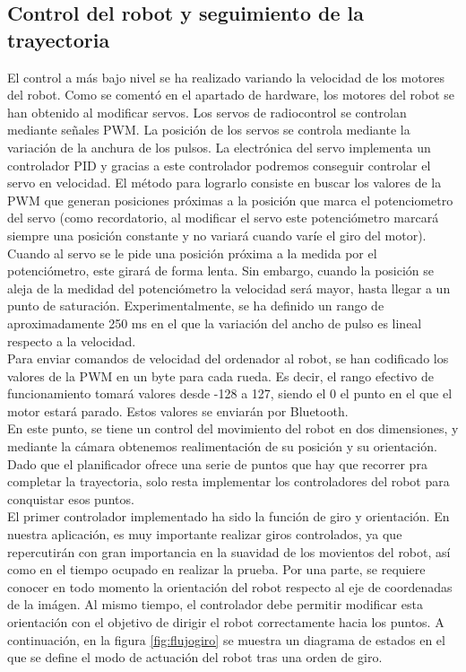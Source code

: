 \subsection{Control del robot y seguimiento de la trayectoria}
\label{control}

El control a más bajo nivel se ha realizado variando la velocidad de los motores del robot. Como se comentó en el apartado de hardware, los motores del robot se han obtenido al modificar servos. Los servos de radiocontrol se controlan mediante señales PWM. La posición de los servos se controla mediante la variación de la anchura de los pulsos. La electrónica del servo implementa un controlador PID y gracias a este controlador podremos conseguir controlar el servo en velocidad. El método para lograrlo consiste en buscar los valores de la PWM que generan posiciones próximas a la posición que marca el potenciometro del servo (como recordatorio, al modificar el servo este potenciómetro marcará siempre una posición constante y no variará cuando varíe el giro del motor). Cuando al servo se le pide una posición próxima a la medida por el potenciómetro, este girará de forma lenta. Sin embargo, cuando la posición se aleja de la medidad del potenciómetro la velocidad será mayor, hasta llegar a un punto de saturación. Experimentalmente, se ha definido un rango de aproximadamente 250 ms en el que la variación del ancho de pulso es lineal respecto a la velocidad. \\

Para enviar comandos de velocidad del ordenador al robot, se han codificado los valores de la PWM en un byte para cada rueda. Es decir, el rango efectivo de funcionamiento tomará valores desde -128 a 127, siendo el 0 el punto en el que el motor estará parado. Estos valores se enviarán por Bluetooth. \\

En este punto, se tiene un control del movimiento del robot en dos dimensiones, y mediante la cámara obtenemos realimentación de su posición y su orientación. Dado que el planificador ofrece una serie de puntos que hay que recorrer pra completar la trayectoria, solo resta implementar los controladores del robot para conquistar esos puntos. \\

El primer controlador implementado ha sido la función de giro y orientación. En nuestra aplicación, es muy importante realizar giros controlados, ya que repercutirán con gran importancia en la suavidad de los movientos del robot, así como en el tiempo ocupado en realizar la prueba. Por una parte, se requiere conocer en todo momento la orientación del robot respecto al eje de coordenadas de la imágen. Al mismo tiempo, el controlador debe permitir modificar esta orientación con el objetivo de dirigir el robot correctamente hacia los puntos. A continuación, en la figura \ref{fig:flujogiro} se muestra un diagrama de estados en el que se define el modo de actuación del robot tras una orden de giro.\\

